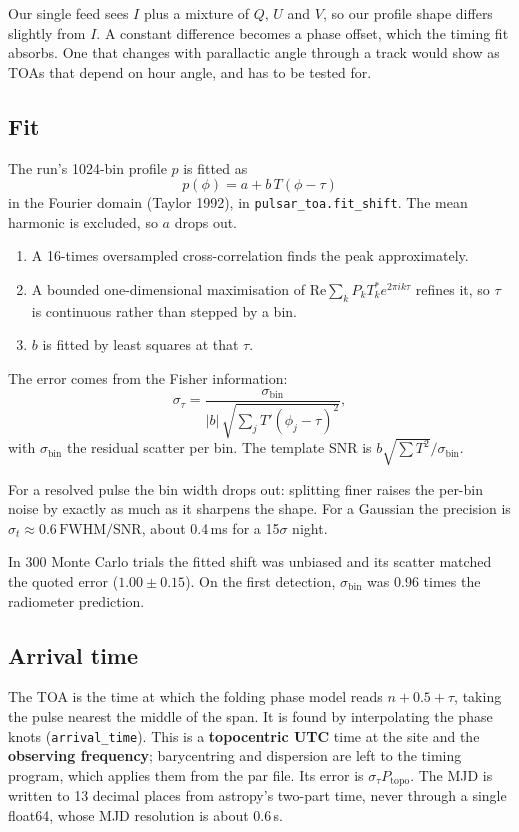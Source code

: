 \documentclass[11pt,a4paper]{article}
\newcommand{\code}[1]{\texttt{#1}}
\begin{document}
Our single feed sees $I$ plus a mixture of $Q$, $U$ and $V$, so our profile shape differs slightly from $I$. A constant difference becomes a phase offset, which the timing fit absorbs. One that changes with parallactic angle through a track would show as TOAs that depend on hour angle, and has to be tested for.

\subsection{Fit}
The run's 1024-bin profile $p$ is fitted as
\begin{equation}
p(\phi) = a + b\,T(\phi - \tau)
\end{equation}
in the Fourier domain (Taylor 1992), in \code{pulsar\_toa.fit\_shift}. The mean harmonic is excluded, so $a$ drops out.
\begin{enumerate}
\item A 16-times oversampled cross-correlation finds the peak approximately.
\item A bounded one-dimensional maximisation of $\mathrm{Re}\sum_k P_k T_k^* e^{2\pi i k\tau}$ refines it, so $\tau$ is continuous rather than stepped by a bin.
\item $b$ is fitted by least squares at that $\tau$.
\end{enumerate}
The error comes from the Fisher information:
\begin{equation}
\sigma_\tau = \frac{\sigma_\mathrm{bin}}{|b|\,\sqrt{\sum_j T'(\phi_j-\tau)^2}},
\end{equation}
with $\sigma_\mathrm{bin}$ the residual scatter per bin. The template SNR is $b\sqrt{\sum T^2}/\sigma_\mathrm{bin}$.

For a resolved pulse the bin width drops out: splitting finer raises the per-bin noise by exactly as much as it sharpens the shape. For a Gaussian the precision is $\sigma_t \approx 0.6\,\mathrm{FWHM}/\mathrm{SNR}$, about 0.4\,ms for a 15$\sigma$ night.

In 300 Monte Carlo trials the fitted shift was unbiased and its scatter matched the quoted error ($1.00\pm0.15$). On the first detection, $\sigma_\mathrm{bin}$ was 0.96 times the radiometer prediction.

\subsection{Arrival time}
The TOA is the time at which the folding phase model reads $n + 0.5 + \tau$, taking the pulse nearest the middle of the span. It is found by interpolating the phase knots (\code{arrival\_time}). This is a \textbf{topocentric UTC} time at the site and the \textbf{observing frequency}; barycentring and dispersion are left to the timing program, which applies them from the par file. Its error is $\sigma_\tau P_\mathrm{topo}$. The MJD is written to 13 decimal places from astropy's two-part time, never through a single float64, whose MJD resolution is about 0.6\,\textmu s.
\end{document}
